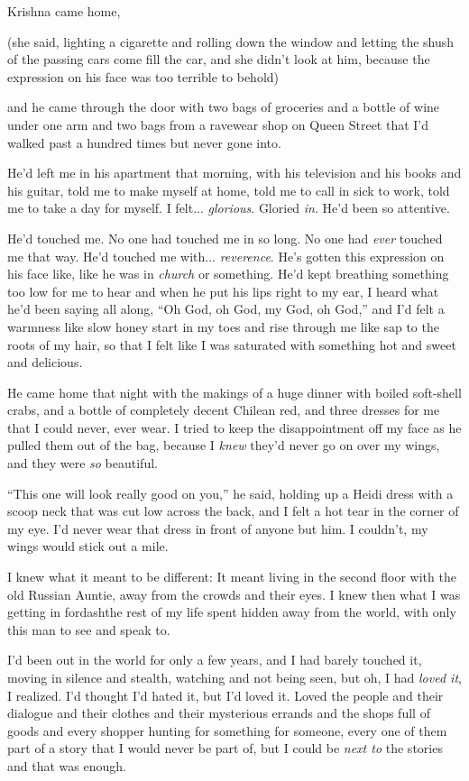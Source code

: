 Krishna came home,

(she said, lighting a cigarette and rolling down the window and
letting the shush of the passing cars come fill the car, and she
didn't look at him, because the expression on his face was too
terrible to behold)

and he came through the door with two bags of groceries and a bottle
of wine under one arm and two bags from a ravewear shop on Queen
Street that I'd walked past a hundred times but never gone into.

He'd left me in his apartment that morning, with his television and
his books and his guitar, told me to make myself at home, told me to
call in sick to work, told me to take a day for myself.  I felt... 
\textit{glorious}.  Gloried \textit{in}.  He'd been so attentive.

He'd touched me.  No one had touched me in so long.  No one had
\textit{ever} touched me that way.  He'd touched me with... 
\textit{reverence}.  He's gotten this expression on his face like,
like he was in \textit{church} or something.  He'd kept breathing
something too low for me to hear and when he put his lips right to my
ear, I heard what he'd been saying all along, ``Oh God, oh God, my
God, oh God,'' and I'd felt a warmness like slow honey start in my
toes and rise through me like sap to the roots of my hair, so that I
felt like I was saturated with something hot and sweet and delicious.

He came home that night with the makings of a huge dinner with boiled
soft-shell crabs, and a bottle of completely decent Chilean red, and
three dresses for me that I could never, ever wear.  I tried to keep
the disappointment off my face as he pulled them out of the bag,
because I \textit{knew} they'd never go on over my wings, and they
were \textit{so} beautiful.

``This one will look really good on you,'' he said, holding up a Heidi
dress with a scoop neck that was cut low across the back, and I felt a
hot tear in the corner of my eye.  I'd never wear that dress in front
of anyone but him.  I couldn't, my wings would stick out a mile.

I knew what it meant to be different:  It meant living in the second
floor with the old Russian Auntie, away from the crowds and their
eyes.  I knew then what I was getting in fordash{}the rest of my life
spent hidden away from the world, with only this man to see and speak
to.

I'd been out in the world for only a few years, and I had barely
touched it, moving in silence and stealth, watching and not being
seen, but oh, I had \textit{loved it}, I realized.  I'd thought I'd
hated it, but I'd loved it.  Loved the people and their dialogue and
their clothes and their mysterious errands and the shops full of goods
and every shopper hunting for something for someone, every one of them
part of a story that I would never be part of, but I could be
\textit{next to} the stories and that was enough.

